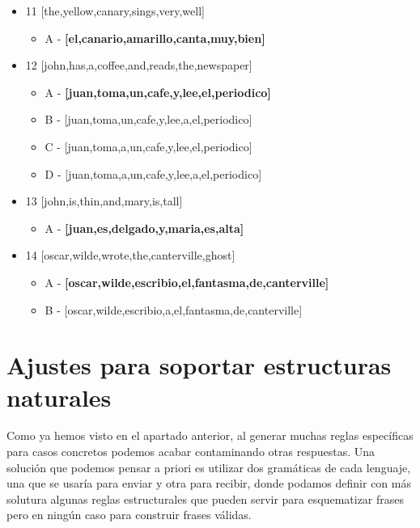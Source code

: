 \documentclass{article}
\begin{document}
\begin{itemize}
    \item 11 [the,yellow,canary,sings,very,well]
    \begin{itemize}
        \item A - \textbf{[el,canario,amarillo,canta,muy,bien]}
    \end{itemize}

    \item 12 [john,has,a,coffee,and,reads,the,newspaper]
    \begin{itemize}
        \item A - \textbf{[juan,toma,un,cafe,y,lee,el,periodico]}
        \item B - [juan,toma,un,cafe,y,lee,a,el,periodico]
        \item C - [juan,toma,a,un,cafe,y,lee,el,periodico]
        \item D - [juan,toma,a,un,cafe,y,lee,a,el,periodico]
    \end{itemize}

    \item 13 [john,is,thin,and,mary,is,tall]
    \begin{itemize}
        \item A - \textbf{[juan,es,delgado,y,maria,es,alta]}
    \end{itemize}

    \item 14 [oscar,wilde,wrote,the,canterville,ghost]
    \begin{itemize}
        \item A - \textbf{[oscar,wilde,escribio,el,fantasma,de,canterville]}
        \item B - [oscar,wilde,escribio,a,el,fantasma,de,canterville]
    \end{itemize}

\end{itemize}


\section{Ajustes para soportar estructuras naturales}
Como ya hemos visto en el apartado anterior, al generar muchas reglas específicas para casos concretos podemos acabar 
contaminando otras respuestas. Una solución que podemos pensar a priori es utilizar dos gramáticas de cada lenguaje, una 
que se usaría para enviar y otra para recibir, donde podamos definir con más solutura algunas reglas estructurales que pueden 
servir para esquematizar frases pero en ningún caso para construir frases válidas. \\
\end{document}
